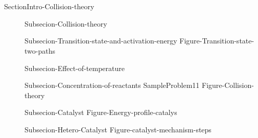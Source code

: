 \documentclass[main.tex]{subfiles}
\newcommand\chapterlabel{Ch-kinetics}
\begin{document}
\section{\color{blue!30!black}{Collision theory}}{SectionIntro-Collision-theory}
\sloppy \begin{description}
\item[] {Subsecion-Collision-theory}
\item[]{Subsecion-Transition-state-and-activation-energy} 
{Figure-Transition-state-two-paths} 
\item[] {Subsecion-Effect-of-temperature} 
\item[] {Subsecion-Concentration-of-reactants}
{SampleProblem11}
 \vspace{1cm}  {Figure-Collision-theory} \newpage
\item[] {Subsecion-Catalyst}
{Figure-Energy-profile-catalys}  
\item[] {Subsecion-Hetero-Catalyst}
{Figure-catalyst-mechanism-steps}  
\end{description}

 
\end{document}

